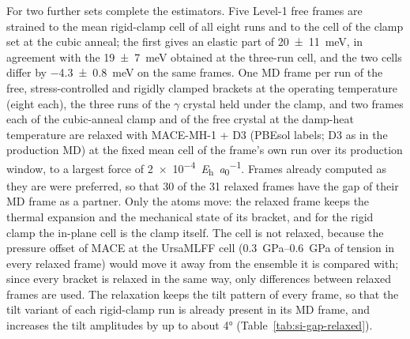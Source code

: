 {\changedcolor
For \CsSnI{} two further sets complete the estimators. Five Level-1 free
frames are strained to the mean rigid-clamp cell of all eight runs and to the
cell of the clamp set at the cubic anneal; the first gives an elastic part of
\SI{20 \pm 11}{meV}, in agreement with the \SI{19 \pm 7}{meV} obtained at the
three-run cell, and the two cells differ by \SI{-4.3 \pm 0.8}{meV} on the same
frames. One MD frame per run of the free, stress-controlled and rigidly clamped
brackets at the operating temperature (eight each), the three runs of the
$\gamma$ crystal held under the clamp, and two frames each of the cubic-anneal
clamp and of the free crystal at the damp-heat temperature are relaxed with
MACE-MH-1 + D3 (PBEsol labels; D3 as in the production MD) at the fixed mean
cell of the frame's own run over its production window, to a largest force of
\SI{2e-4}{\hartree\per\bohr}. Frames already computed as they are were
preferred, so that 30 of the 31 relaxed frames have the gap of their MD frame
as a partner. Only the atoms move: the relaxed frame keeps the thermal
expansion and the mechanical state of its bracket, and for the rigid clamp the
in-plane cell is the clamp itself. The cell is not relaxed, because the
pressure offset of MACE at the UrsaMLFF cell (\SIrange{0.3}{0.6}{GPa} of
tension in every relaxed frame) would move it away from the ensemble it is
compared with; since every bracket is relaxed in the same way, only differences
between relaxed frames are used. The relaxation keeps the tilt pattern of every
frame, so that the tilt variant of each rigid-clamp run is already present in
its MD frame, and increases the tilt amplitudes by up to about \ang{4}
(Table~\ref{tab:si-gap-relaxed}).\par}
